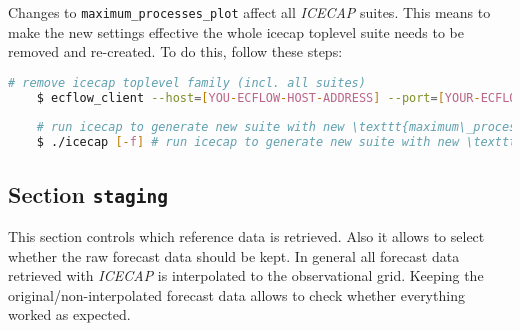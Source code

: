 \documentclass[DIV=10, parskip=full]{scrreprt}
\newcommand{\ice}{\textit{ICECAP}\xspace}
\begin{document}
 Changes to \texttt{maximum\_processes\_plot} affect all \ice suites. This means to make the new settings effective the whole icecap toplevel suite needs to be removed and re-created. To do this, follow these steps:
  \begin{lstlisting}[language=bash]
 	# remove icecap toplevel family (incl. all suites)
 	$ ecflow_client --host=[YOU-ECFLOW-HOST-ADDRESS] --port=[YOUR-ECFLOW-PORT]] --delete /icecap
 	
 	# run icecap to generate new suite with new \texttt{maximum\_processes\_plot} value
 	$ ./icecap [-f] # run icecap to generate new suite with new \texttt{maximum\_processes\_plot} value
 \end{lstlisting}
 


\subsection{Section \texttt{staging}} \label{sec:config_staging}
This section controls which reference data is retrieved. Also it allows to select whether the raw forecast data should be kept. In general all forecast data retrieved with \ice is interpolated to the observational grid. Keeping the original/non-interpolated forecast data allows to check whether everything worked as expected. 
 
\end{document}
